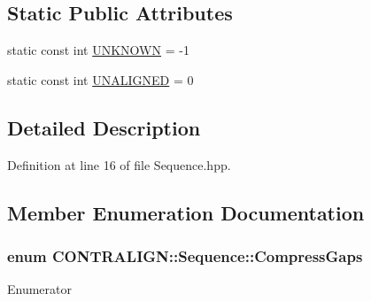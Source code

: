 \subsection*{Static Public Attributes}
\begin{DoxyCompactItemize}
\item 
static const int \hyperlink{class_c_o_n_t_r_a_l_i_g_n_1_1_sequence_a6b77aa13d532d0e59d90e82a59100755}{U\+N\+K\+N\+O\+W\+N} = -\/1
\item 
static const int \hyperlink{class_c_o_n_t_r_a_l_i_g_n_1_1_sequence_a774a2f48e7469edbb81641e5abf26ccd}{U\+N\+A\+L\+I\+G\+N\+E\+D} = 0
\end{DoxyCompactItemize}


\subsection{Detailed Description}


Definition at line 16 of file Sequence.\+hpp.



\subsection{Member Enumeration Documentation}
\hypertarget{class_c_o_n_t_r_a_l_i_g_n_1_1_sequence_ad5c978f10d584ae0e8460033964162c3}{
\subsubsection[{Compress\+Gaps}]{\setlength{\rightskip}{0pt plus 5cm}enum {\bf C\+O\+N\+T\+R\+A\+L\+I\+G\+N\+::\+Sequence\+::\+Compress\+Gaps}}}\label{class_c_o_n_t_r_a_l_i_g_n_1_1_sequence_ad5c978f10d584ae0e8460033964162c3}
\begin{Desc}
\item[Enumerator]\par
\begin{description}
\item[{\em 
\hypertarget{class_c_o_n_t_r_a_l_i_g_n_1_1_sequence_ad5c978f10d584ae0e8460033964162c3af58075360dac5d2e0da7b362c977e9b7}{C\+O\+M\+P\+R\+E\+S\+S\+\_\+\+G\+A\+P\+S}\label{class_c_o_n_t_r_a_l_i_g_n_1_1_sequence_ad5c978f10d584ae0e8460033964162c3af58075360dac5d2e0da7b362c977e9b7}
}]\end{description}
\end{Desc}


